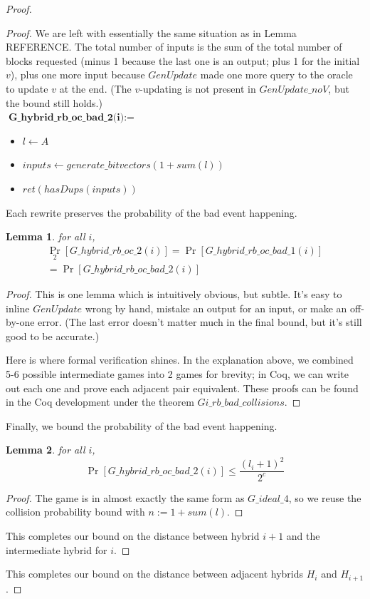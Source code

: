 \documentclass[12pt,lot, lof]{puthesis}
\newenvironment{game}
{ \begin{itemize}[noitemsep,nolistsep] 
}
{ \end{itemize}                  }
\newcommand{\f}{\frac}
\newcommand{\lar}{\leftarrow}
\newtheorem{lem}{Lemma}[thm]
\begin{document}
\begin{proof}
\begin{proof}
We are left with essentially the same situation as in Lemma REFERENCE. The total number of inputs is the sum of the total number of blocks requested (minus 1 because the last one is an output; plus 1 for the initial $v$), plus one more input because $GenUpdate$ made one more query to the oracle to update $v$ at the end. (The $v$-updating is not present in $GenUpdate\_noV$, but the bound still holds.)\\

$\textbf{G\_hybrid\_rb\_oc\_bad\_2(i)} := $
\begin{game}
\item[] $l \lar A$
\item[] $inputs \lar generate\_bitvectors(1 + sum(l))$
\item[] $ret(hasDups(inputs))$ \\
\end{game}

Each rewrite preserves the probability of the bad event happening.

\begin{lem} for all $i$,
  \begin{gather*}
    \Pr_2[G\_hybrid\_rb\_oc\_2(i)] = \Pr[G\_hybrid\_rb\_oc\_bad\_1(i)]\\
    = \Pr[G\_hybrid\_rb\_oc\_bad\_2(i)]
  \end{gather*}
\end{lem}
\begin{proof}
This is one lemma which is intuitively obvious, but subtle. It's easy to inline $GenUpdate$ wrong by hand, mistake an output for an input, or make an off-by-one error. (The last error doesn't matter much in the final bound, but it's still good to be accurate.) 

Here is where formal verification shines. In the explanation above, we combined 5-6 possible intermediate games into 2 games for brevity; in Coq, we can write out each one and prove each adjacent pair equivalent. These proofs can be found in the Coq development under the theorem $Gi\_rb\_bad\_collisions$.
\end{proof}

Finally, we bound the probability of the bad event happening.

\begin{lem} for all $i$,
$$\Pr[G\_hybrid\_rb\_oc\_bad\_2(i)] \leq \f{(l_i+1)^2}{2^c}$$ \end{lem}
\begin{proof} 
The game is in almost exactly the same form as $G\_ideal\_4$, so we reuse the collision probability bound with $n := 1 + sum(l)$.
\end{proof}

This completes our bound on the distance between hybrid $i+1$ and the intermediate hybrid for $i$.
\end{proof}

This completes our bound on the distance between adjacent hybrids $H_i$ and $H_{i+1}$.

\end{proof}
\end{document}
